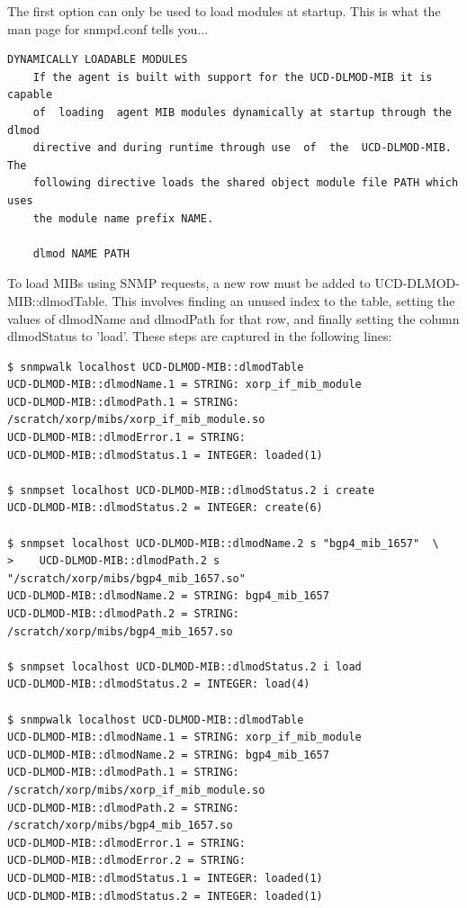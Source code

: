 \documentclass[11pt]{article}
\begin{document}
The first option can only be used to load modules at startup.  This is what the
man page for snmpd.conf tells you...

\begin{verbatim}
DYNAMICALLY LOADABLE MODULES
	If the agent is built with support for the UCD-DLMOD-MIB it is  capable
	of  loading  agent MIB modules dynamically at startup through the dlmod
	directive and during runtime through use  of  the  UCD-DLMOD-MIB.   The
	following directive loads the shared object module file PATH which uses
	the module name prefix NAME.

	dlmod NAME PATH
\end{verbatim}


To load MIBs using SNMP requests, a new row must be added to
UCD-DLMOD-MIB::dlmodTable.  This involves finding an unused index to the table,
setting the values of dlmodName and dlmodPath for that row, and finally setting
the column dlmodStatus to 'load'.  These steps are captured in the following
lines:

\begin{verbatim}
$ snmpwalk localhost UCD-DLMOD-MIB::dlmodTable
UCD-DLMOD-MIB::dlmodName.1 = STRING: xorp_if_mib_module
UCD-DLMOD-MIB::dlmodPath.1 = STRING: /scratch/xorp/mibs/xorp_if_mib_module.so
UCD-DLMOD-MIB::dlmodError.1 = STRING:
UCD-DLMOD-MIB::dlmodStatus.1 = INTEGER: loaded(1)

$ snmpset localhost UCD-DLMOD-MIB::dlmodStatus.2 i create
UCD-DLMOD-MIB::dlmodStatus.2 = INTEGER: create(6)

$ snmpset localhost UCD-DLMOD-MIB::dlmodName.2 s "bgp4_mib_1657"  \ 
>    UCD-DLMOD-MIB::dlmodPath.2 s "/scratch/xorp/mibs/bgp4_mib_1657.so"
UCD-DLMOD-MIB::dlmodName.2 = STRING: bgp4_mib_1657
UCD-DLMOD-MIB::dlmodPath.2 = STRING: /scratch/xorp/mibs/bgp4_mib_1657.so

$ snmpset localhost UCD-DLMOD-MIB::dlmodStatus.2 i load
UCD-DLMOD-MIB::dlmodStatus.2 = INTEGER: load(4)

$ snmpwalk localhost UCD-DLMOD-MIB::dlmodTable
UCD-DLMOD-MIB::dlmodName.1 = STRING: xorp_if_mib_module
UCD-DLMOD-MIB::dlmodName.2 = STRING: bgp4_mib_1657
UCD-DLMOD-MIB::dlmodPath.1 = STRING: /scratch/xorp/mibs/xorp_if_mib_module.so
UCD-DLMOD-MIB::dlmodPath.2 = STRING: /scratch/xorp/mibs/bgp4_mib_1657.so
UCD-DLMOD-MIB::dlmodError.1 = STRING:
UCD-DLMOD-MIB::dlmodError.2 = STRING:
UCD-DLMOD-MIB::dlmodStatus.1 = INTEGER: loaded(1)
UCD-DLMOD-MIB::dlmodStatus.2 = INTEGER: loaded(1)
\end{verbatim}
\end{document}
